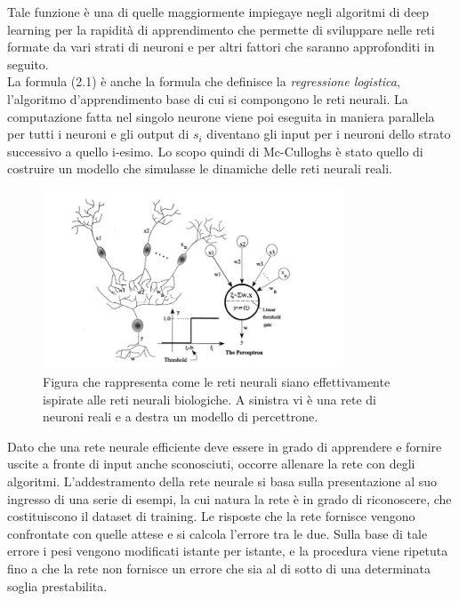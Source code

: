 Tale funzione è una di quelle maggiormente impiegaye negli algoritmi di deep learning per la rapidità di 
apprendimento che permette di sviluppare nelle reti formate da vari strati di neuroni 
e per altri fattori che saranno approfonditi in seguito. \\
La formula (2.1) è anche la formula che definisce la \emph{regressione logistica}, l’algoritmo d’apprendimento base di cui si compongono le
reti neurali.
La computazione fatta nel singolo neurone viene poi eseguita in maniera parallela per tutti 
i neuroni e gli output di \(s_i\) diventano gli input per i neuroni dello strato successivo a quello
 i-esimo. Lo scopo quindi di Mc-Culloghs è stato quello di costruire un modello che simulasse le dinamiche 
 delle reti neurali reali.\\
 \begin{figure}[hb!]
  \centering
  \includegraphics[width=0.8\textwidth]{Figures/confronto neurone biologico-artificiale.PNG}
  \caption{\small{Figura che rappresenta come le reti neurali siano effettivamente ispirate alle reti neurali biologiche. A sinistra vi è una rete di neuroni reali e a destra un modello di percettrone.
  } %
  } %
  \label{fi:dcalc}
\end{figure}

Dato che una rete neurale efficiente deve essere in grado di apprendere e fornire uscite a fronte di 
input anche sconosciuti, occorre allenare la rete con degli algoritmi. 
L’addestramento della rete neurale si basa sulla presentazione al suo ingresso di una serie di esempi,
 la cui natura la rete è in grado di riconoscere, che costituiscono il dataset di training. 
 Le risposte che la rete fornisce vengono confrontate con quelle attese e si calcola l’errore tra le due.
  Sulla base di tale errore i pesi vengono modificati istante per istante, e la procedura viene ripetuta
   fino a che la rete non fornisce un errore che sia al di sotto di una determinata soglia prestabilita.
     



